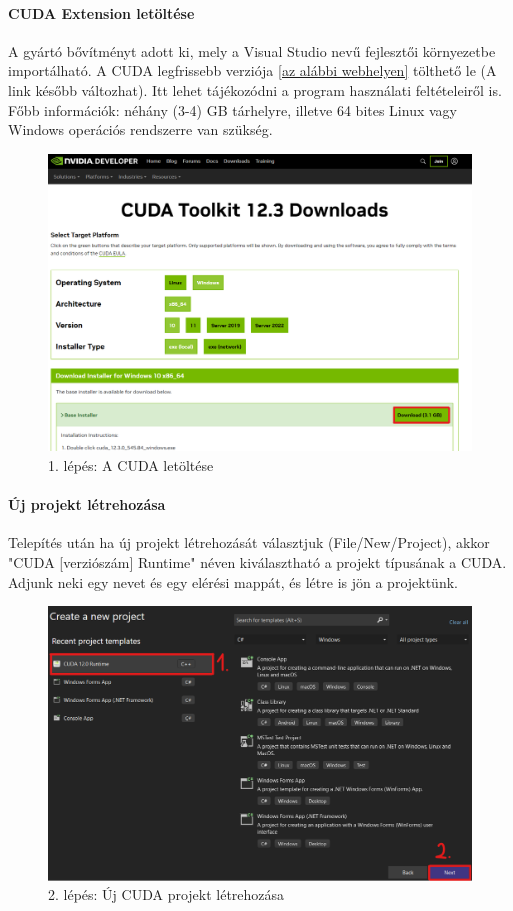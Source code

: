 \paragraph{CUDA Extension letöltése}
A gyártó bővítményt adott ki, mely a Visual Studio nevű fejlesztői környezetbe importálható. A CUDA legfrissebb verziója \href{https://developer.nvidia.com/cuda-downloads}{[az alábbi webhelyen]} tölthető le (A link később változhat). Itt lehet tájékozódni a program használati feltételeiről is. Főbb információk: néhány (3-4) GB tárhelyre, illetve 64 bites Linux vagy Windows operációs rendszerre van szükség.

\begin{figure}[ht!]
	\centering
	\includegraphics[width=150mm, keepaspectratio] {figures/install-1.png}
	\caption{1. lépés: A CUDA letöltése}
\end{figure}

\paragraph{Új projekt létrehozása}
Telepítés után ha új projekt létrehozását választjuk (File/New/Project), akkor "CUDA [verziószám] Runtime" néven kiválasztható a projekt típusának a CUDA. Adjunk neki egy nevet és egy elérési mappát, és létre is jön a projektünk.

\begin{figure}[ht!]
	\centering
	\includegraphics[width=150mm, keepaspectratio] {figures/install-2.png}
	\caption{2. lépés: Új CUDA projekt létrehozása}
\end{figure}


